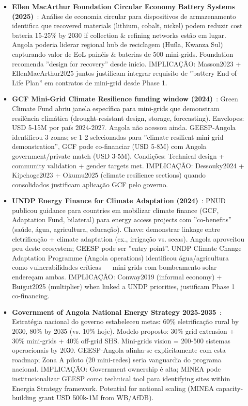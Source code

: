 \documentclass[12pt, a4paper]{article}
\begin{document}
{{{{{{{{{{{{\begin{itemize}
  \item \textbf{Ellen MacArthur Foundation Circular Economy Battery Systems (2025)}~\citep{EllenMacArthur2025}: Análise de economia circular para dispositivos de armazenamento identifica que recovered materials (lithium, cobalt, nickel) podem reduzir cost bateria 15-25\% by 2030 if collection & refining networks estão em lugar. Angola poderia liderar regional hub de reciclagem (Huíla, Kwanza Sul) capturando valor de EoL painéis & baterias de 500 mini-grids. Foundation recomenda ''design for recovery'' desde início. IMPLICAÇÃO: Masson2023 + EllenMacArthur2025 juntos justificam integrar requisito de ''battery End-of-Life Plan'' em contratos de mini-grid desde Phase 1.
  
  \item \textbf{GCF Mini-Grid Climate Resilience funding window (2024)}~\citep{GCF2024}: Green Climate Fund abriu janela específica para mini-grids que demonstram resilência climática (drought-resistant design, storage, forecasting). Envelopes: USD 5-15M por país 2024-2027. Angola não acessou ainda. GEESP-Angola identificou 3 zonas; se 1-2 selecionadas para ''climate-resilient mini-grid demonstration'', GCF pode co-financiar (USD 5-8M) com Angola government/private match (USD 3-5M). Condições: Technical design + community validation + gender targets met. IMPLICAÇÃO: Dessouky2024 + Kipchoge2023 + Okumu2025 (climate resilience sections) quando consolidados justificam aplicação GCF pelo governo.
  
  \item \textbf{UNDP Energy Finance for Climate Adaptation (2024)}~\citep{UNDP2024}: PNUD publicou guidance para countries em mobilizar climate finance (GCF, Adaptation Fund, bilateral) para energy access projects com ''co-benefits'' (saúde, água, agricultura, educação). Chave: demonstrar linkage entre eletrificação + climate adaptation (ex., irrigação vs. secas). Angola aproveitou peu deste ecosystem; GEESP pode ser ''entry point''. UNDP Climate Change Adaptation Programme (Angola operations) identificou água/agricultura como vulnerabilidades críticas — mini-grids com bombeamento solar endereçam ambas. IMPLICAÇÃO: Conway2019 (informal economy) + Buigut2025 (multiplier) when linked a UNDP priorities, justificam Phase 1 co-financing.
  
  \item \textbf{Government of Angola National Energy Strategy 2025-2035}~\citep{Angola2025}: Estratégia nacional do governo estabeleceu metas: 60\% eletrificação rural by 2030, 80\% by 2035 (vs. 10\% hoje). Modelo proposto: 30\% grid extension + 30\% mini-grids + 40\% off-grid SHS. Mini-grids vision = 200-500 sistemas operacionais by 2030. GEESP-Angola alinha-se explicitamente com esta roadmap; Zona A piloto (20 mini-redes) seria vanguardia do programa nacional. IMPLICAÇÃO: Government ownership é alta; MINEA pode institucionalizar GEESP como technical tool para identifying sites within Energia Strategy framework. Potential for national scaling (MINEA capacity-building grant USD 500k-1M from WB/AfDB).
  

\end{itemize}}}}}}}}}}}}}
\end{document}
